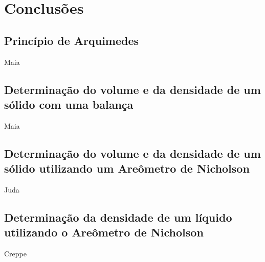 \newpage
\section{Conclusões}


\subsection{Princípio de Arquimedes}

Maia


\subsection{Determinação do volume e da densidade de um sólido com
uma balança}

Maia


\subsection{Determinação do volume e da densidade de um sólido
utilizando um Areômetro de Nicholson}

Juda


\subsection{Determinação da densidade de um líquido utilizando o
Areômetro de Nicholson}

Creppe
